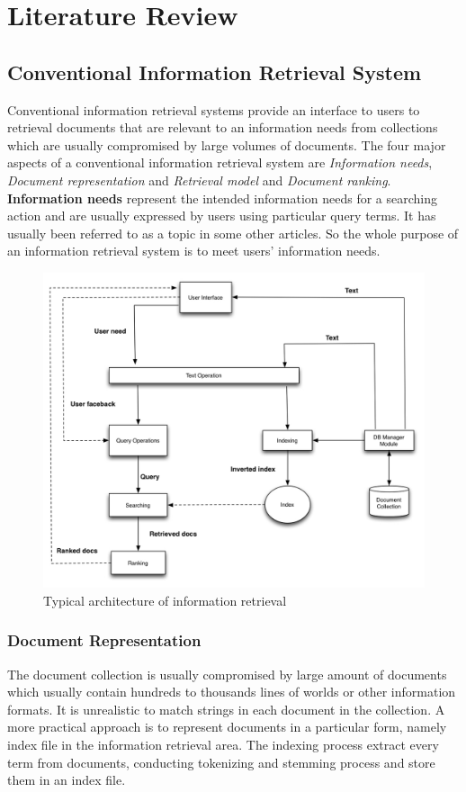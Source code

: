 \chapter{Literature Review}

\section{Conventional Information Retrieval System}
Conventional information retrieval systems provide an interface to users to retrieval documents that are relevant to an information needs from collections which are usually compromised by large volumes of documents. The four major aspects of a conventional information retrieval system are \textit{Information needs}, \textit{Document representation} and \textit{Retrieval model} and \textit{Document ranking}. \textbf{Information needs} represent the intended information needs for a searching action and are usually expressed by users using particular query terms. It has usually been referred to as a topic in some other articles. So the whole purpose of an information retrieval system is to meet users' information needs.
\begin{figure}
\caption{Typical architecture of information retrieval}
\label{fig:ir}
\begin{center}
\includegraphics[width=12cm]{ir.jpg}
\end{center}
\end{figure}
  
\subsection{Document Representation}
The document collection is usually compromised by large amount of documents which usually contain hundreds to thousands lines of worlds or other information formats. It is unrealistic to match strings in each document in the collection. A more practical approach is to represent documents in a particular form, namely index file in the information retrieval area. The indexing process extract every term from documents, conducting tokenizing and stemming process and store them in an index file. 
